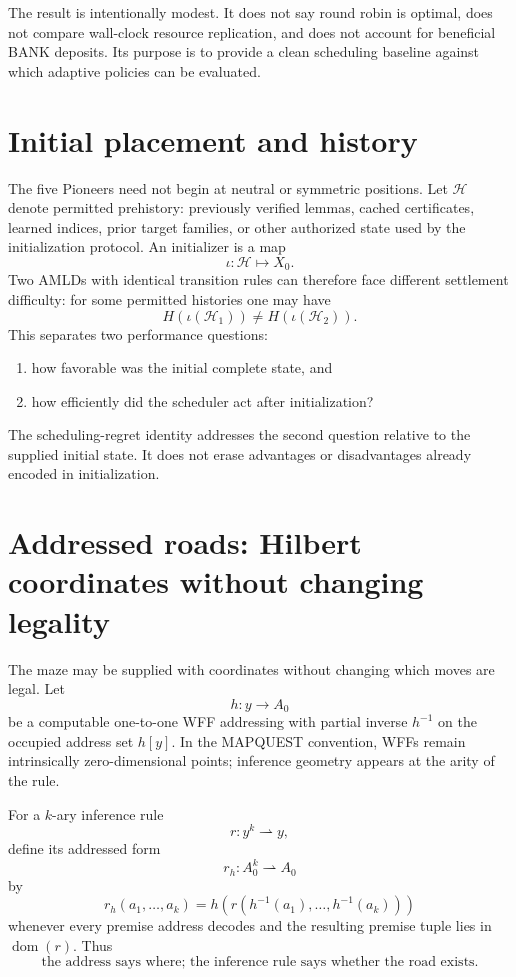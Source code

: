 \documentclass[11pt]{article}
\theoremstyle{remark}
\begin{document}
The result is intentionally modest. It does not say round robin is optimal, does not compare wall-clock resource replication, and does not account for beneficial BANK deposits. Its purpose is to provide a clean scheduling baseline against which adaptive policies can be evaluated.

\section{Initial placement and history}

The five Pioneers need not begin at neutral or symmetric positions. Let $\mathcal H$ denote permitted prehistory: previously verified lemmas, cached certificates, learned indices, prior target families, or other authorized state used by the initialization protocol. An initializer is a map
\[
\iota:\mathcal H\mapsto X_0.
\]
Two AMLDs with identical transition rules can therefore face different settlement difficulty: for some permitted histories one may have
\[
H(\iota(\mathcal H_1))\ne H(\iota(\mathcal H_2)).
\]
This separates two performance questions:
\begin{enumerate}[label=(\roman*),leftmargin=2.3em]
\item how favorable was the initial complete state, and
\item how efficiently did the scheduler act after initialization?
\end{enumerate}
The scheduling-regret identity addresses the second question relative to the supplied initial state. It does not erase advantages or disadvantages already encoded in initialization.


\section{Addressed roads: Hilbert coordinates without changing legality}

The maze may be supplied with coordinates without changing which moves are legal. Let
\[
h:y\longrightarrow A_0
\]
be a computable one-to-one WFF addressing with partial inverse $h^{-1}$ on the occupied address set $h[y]$. In the MAPQUEST convention, WFFs remain intrinsically zero-dimensional points; inference geometry appears at the arity of the rule.

For a $k$-ary inference rule
\[
r:y^k\rightharpoonup y,
\]
define its addressed form
\[
r_h:A_0^k\rightharpoonup A_0
\]
by
\[
r_h(a_1,\ldots,a_k)
=
h\!\left(r(h^{-1}(a_1),\ldots,h^{-1}(a_k))\right)
\]
whenever every premise address decodes and the resulting premise tuple lies in $\operatorname{dom}(r)$. Thus
\[
\boxed{\text{the address says where; the inference rule says whether the road exists.}}
\]
\end{document}
